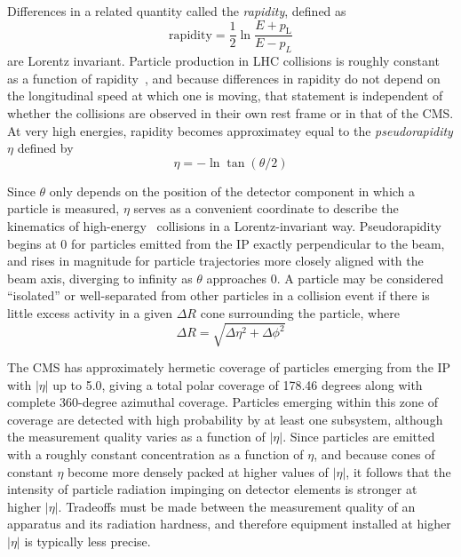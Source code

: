 Differences in a related quantity called the \textit{rapidity}, defined as
\begin{equation}
\mathrm{rapidity} = \frac{1}{2}\ln{\frac{E+p_\mathrm{L}}{E-p_{L}}}
\label{eq:rapidity}
\end{equation}
are Lorentz invariant. Particle production in LHC collisions is roughly constant as a function of rapidity~\cite{ref:lhcrun1harvest_ch3}, and because
differences in rapidity do not depend on the longitudinal speed at which one is moving, that statement is independent
of whether the collisions are observed in their own rest frame or in that of the CMS. At very high
energies, rapidity becomes approximatey equal to the \textit{pseudorapidity} $\eta$ defined by
\begin{equation}
\eta = -\ln{\tan{(\theta/2)}}
\label{eq:pseudorapidity}
\end{equation}

Since $\theta$ only depends on the position of the detector component in which a particle is measured, $\eta$
serves as a convenient coordinate to describe the kinematics of high-energy \Pp\Pp\ collisions in a Lorentz-invariant way.
Pseudorapidity begins at 0 for particles emitted from the IP exactly perpendicular to the beam, and rises in magnitude for particle
trajectories more closely aligned with the beam axis, diverging to infinity as $\theta$ approaches 0. A particle may be considered ``isolated''
or well-separated from other particles in a collision event if there is little excess activity in a given $\Delta R$ cone surrounding
the particle, where
\begin{equation}
\Delta R = \sqrt{\Delta\eta^{2} + \Delta\phi^{2}}
\label{eq:deltaR}
\end{equation}

The CMS has approximately hermetic coverage of particles emerging from the IP with $|\eta|$
up to 5.0, giving a total polar coverage of 178.46 degrees along with complete 360-degree azimuthal coverage. Particles emerging
within this zone of coverage are detected with high probability by at least one subsystem, although the measurement quality varies
as a function of $|\eta|$. Since particles are emitted with a roughly constant concentration as a function of $\eta$, and because
cones of constant $\eta$ become more densely packed at higher values of $|\eta|$, it follows that the intensity of particle radiation
impinging on detector elements is stronger at higher $|\eta|$. Tradeoffs must be made between the measurement quality of an apparatus
and its radiation hardness, and therefore equipment installed at higher $|\eta|$ is typically less precise.

